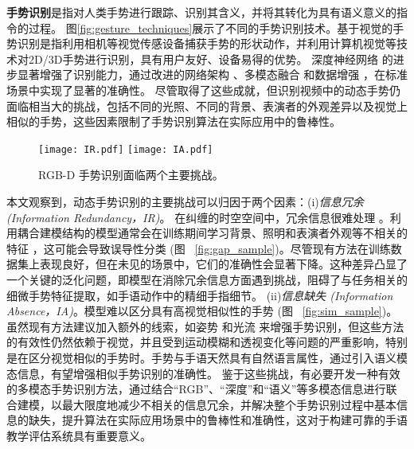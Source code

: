 \textbf{手势识别}是指对人类手势进行跟踪、识别其含义，并将其转化为具有语义意义的指令的过程\cite{rautaray2015vision}。
图\ref{fig:gesture_techniques}展示了不同的手势识别技术。基于视觉的手势识别是指利用相机等视觉传感设备捕获手势的形状动作，并利用计算机视觉等技术对2D/3D手势进行识别，具有用户友好、设备易得的优势。
深度神经网络 \cite{zhou2023unified,li2021trear} 的进步显著增强了识别能力，通过改进的网络架构 \cite{zhu2019redundancy,zhu2018continuous,zhou2022decoupling}、多模态融合 \cite{li2021trear,narayana2018focus,yu2021searching} 和数据增强 \cite{li2021trear,zuo2023natural}，在标准场景中实现了显著的准确性。
尽管取得了这些成就，但识别视频中的动态手势仍面临相当大的挑战，包括不同的光照、不同的背景、表演者的外观差异以及视觉上相似的手势，这些因素限制了手势识别算法在实际应用中的鲁棒性。

\begin{figure}[tb]
  \centering
  {\texttt{[image: IR.pdf]}}
  {\texttt{[image: IA.pdf]}}
  \caption{RGB-D 手势识别面临两个主要挑战。}
  \label{fig:samples}
  \end{figure}

本文观察到，动态手势识别的主要挑战可以归因于两个因素：(i)\textit{信息冗余 (Information Redundancy，IR)}。
在纠缠的时空空间中，冗余信息很难处理 \cite{zhou2023unified, LI2024110536}。利用耦合建模结构的模型通常会在训练期间学习背景、照明和表演者外观等不相关的特征 \cite{zhou2023unified}，这可能会导致误导性分类 (图 ~\ref{fig:gap_sample})。尽管现有方法在训练数据集上表现良好，但在未见的场景中，它们的准确性会显著下降。这种差异凸显了一个关键的泛化问题，即模型在消除冗余信息方面遇到挑战，阻碍了与任务相关的细微手势特征提取，如手语动作中的精细手指细节。
(ii)\textit{信息缺失 (Information Absence，IA)}。模型难以区分具有高视觉相似性的手势 (图 ~\ref{fig:sim_sample})。虽然现有方法建议加入额外的线索，如姿势 \cite{wan2016chalearn,zuo2023natural} 和光流 \cite{narayana2018focus} 来增强手势识别，但这些方法的有效性仍然依赖于视觉，并且受到运动模糊和透视变化等问题的严重影响，特别是在区分视觉相似的手势时。手势与手语天然具有自然语言属性，通过引入语义模态信息，有望增强相似手势识别的准确性。
鉴于这些挑战，有必要开发一种有效的多模态手势识别方法，通过结合“RGB”、“深度”和“语义”等多模态信息进行联合建模，以最大限度地减少不相关的信息冗余，并解决整个手势识别过程中基本信息的缺失，提升算法在实际应用场景中的鲁棒性和准确性，这对于构建可靠的手语教学评估系统具有重要意义。


